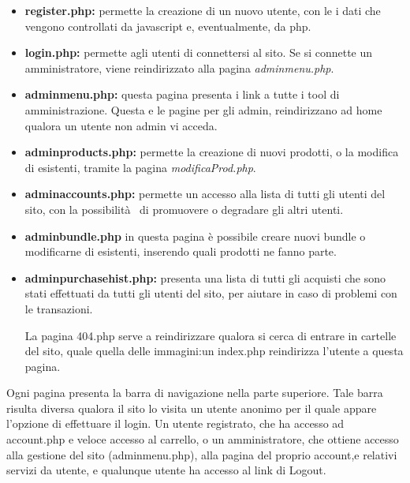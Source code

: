 \begin{itemize}
\item \textbf{register.php:} permette la creazione di un nuovo utente, con le i dati che vengono controllati da javascript e, eventualmente, da php.

\item \textbf{login.php:} permette agli utenti di connettersi al sito. Se si connette un amministratore, viene reindirizzato alla pagina \textit{adminmenu.php}.

\item \textbf{adminmenu.php:} questa pagina presenta i link a tutte i tool di amministrazione. Questa e le pagine per gli admin, reindirizzano ad home qualora un utente non admin vi acceda.

\item \textbf{adminproducts.php:} permette la creazione di nuovi prodotti, o la modifica di esistenti, tramite la pagina \textit{modificaProd.php}.

\item \textbf{adminaccounts.php:} permette un accesso alla lista di tutti gli utenti del sito, con la possibilità  di promuovere o degradare gli altri utenti.

\item \textbf{adminbundle.php} in questa pagina è possibile creare nuovi bundle o modificarne di esistenti, inserendo quali prodotti ne fanno parte.

\item \textbf{adminpurchasehist.php:} presenta una lista di tutti gli acquisti che sono stati effettuati da tutti gli utenti del sito, per aiutare in caso di problemi con le transazioni.

La pagina 404.php serve a reindirizzare qualora si cerca di entrare in cartelle del sito, quale quella delle immagini:un index.php reindirizza l'utente a questa pagina.

\end{itemize}
Ogni pagina presenta la barra di navigazione nella parte superiore. Tale barra risulta diversa qualora il sito lo visita un utente anonimo per il quale appare l'opzione di effettuare il login. Un utente registrato, che ha accesso ad account.php e veloce accesso al carrello, o un amministratore, che ottiene accesso alla gestione del sito (adminmenu.php), alla pagina del proprio account,e relativi servizi da utente, e qualunque utente ha accesso al link di Logout.

